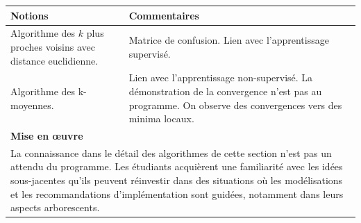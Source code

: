 \begin{tabularx}{\textwidth}[t]{|X|X|}
  \hline 
  \textbf{Notions} & \textbf{Commentaires} \\
  \hline 
  Algorithme des $k$ plus proches voisins avec distance euclidienne.
   & 
   Matrice de confusion. Lien avec l'apprentissage supervisé.
  \\
  \hline 
  Algorithme des  k-moyennes.
   & 
   Lien avec l'apprentissage non-supervisé.
La démonstration de la convergence n'est pas au programme. On observe des convergences vers des minima locaux.
  \\
  \hline 
  \multicolumn{2}{|X|}{\textbf{Mise en œuvre}}
  \\
  \hline 
  \multicolumn{2}{|p{0.95\textwidth}|}{
  La connaissance dans le détail des algorithmes de cette section n'est pas un attendu du programme. Les étudiants acquièrent une familiarité avec les idées sous-jacentes qu'ils peuvent réinvestir dans des situations où les modélisations et les recommandations d'implémentation sont guidées, notamment dans leurs aspects arborescents.
  } 
  \\
  \hline
\end{tabularx}
